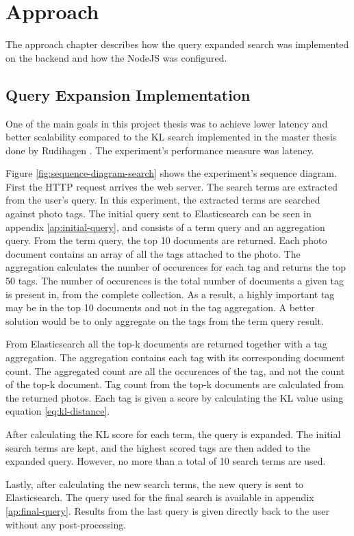 \chapter{Approach}
\label{ch:approach}
The approach chapter describes how the query expanded search was implemented on the backend and how the NodeJS was configured.

\section{Query Expansion Implementation}
One of the main goals in this project thesis was to achieve lower latency and better scalability compared to the KL search implemented in the master thesis done by Rudihagen \cite{master-thesis}.
The experiment's performance measure was latency.

Figure \ref{fig:sequence-diagram-search} shows the experiment's sequence diagram.
First the HTTP request arrives the web server.
The search terms are extracted from the user's query.
In this experiment, the extracted terms are searched against photo tags.
The initial query sent to Elasticsearch can be seen in appendix \ref{ap:initial-query},
and consists of a term query and an aggregation query.
From the term query, the top 10 documents are returned.
Each photo document contains an array of all the tags attached to the photo.
The aggregation calculates the number of occurences for each tag and returns the top 50 tags.
The number of occurences is the total number of documents a given tag is present in, from the complete collection.
As a result, a highly important tag may be in the top 10 documents and not in the tag aggregation.
A better solution would be to only aggregate on the tags from the term query result.

From Elasticsearch all the top-k documents are returned together with a tag aggregation.
The aggregation contains each tag with its corresponding document count.
The aggregated count are all the occurences of the tag, and not the count of the top-k document.
Tag count from the top-k documents are calculated from the returned photos.
Each tag is given a score by calculating the KL value using equation \ref{eq:kl-distance}.

After calculating the KL score for each term, the query is expanded.
The initial search terms are kept, and the highest scored tags are then added to the expanded query.
However, no more than a total of 10 search terms are used.

Lastly, after calculating the new search terms, the new query is sent to Elasticsearch.
The query used for the final search is available in appendix \ref{ap:final-query}.
Results from the last query is given directly back to the user without any post-processing.

